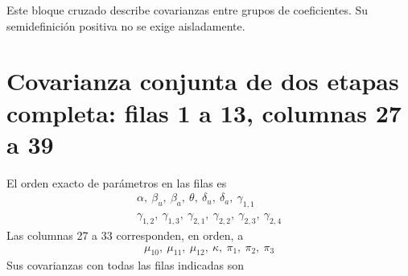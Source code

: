 \documentclass[11pt,a4paper]{article}
\begin{document}
Este bloque cruzado describe covarianzas entre grupos de coeficientes. Su semidefinición positiva no se exige aisladamente.

\clearpage
\section{Covarianza conjunta de dos etapas completa: filas 1 a 13, columnas 27 a 39}
El orden exacto de parámetros en las filas es
\[
\begin{gathered}\alpha,\ \beta_u,\ \beta_a,\ \theta,\ \delta_u,\ \delta_a,\ \gamma_{1,1}\\\gamma_{1,2},\ \gamma_{1,3},\ \gamma_{2,1},\ \gamma_{2,2},\ \gamma_{2,3},\ \gamma_{2,4}\end{gathered}
\]
Las columnas 27 a 33 corresponden, en orden, a
\[
\begin{gathered}\mu_10,\ \mu_11,\ \mu_12,\ \kappa,\ \pi_1,\ \pi_2,\ \pi_3\end{gathered}
\]
Sus covarianzas con todas las filas indicadas son
\end{document}
